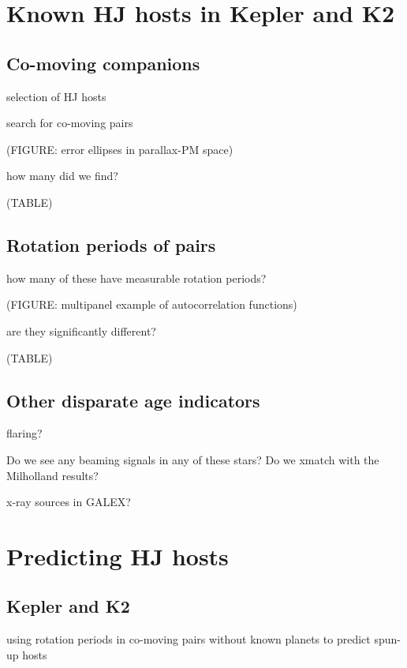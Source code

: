 \documentclass[twocolumn]{aastex62}
\begin{document}



\section{Known HJ hosts in Kepler and K2}
\subsection{Co-moving companions}

selection of HJ hosts

search for co-moving pairs

(FIGURE: error ellipses in parallax-PM space)

how many did we find?

(TABLE)

\subsection{Rotation periods of pairs}

how many of these have measurable rotation periods?

(FIGURE: multipanel example of autocorrelation functions)

are they significantly different?

(TABLE)

\subsection{Other disparate age indicators}

flaring?

Do we see any beaming signals in any of these stars? Do we xmatch with the Milholland results?

x-ray sources in GALEX?



\section{Predicting HJ hosts}
\subsection{Kepler and K2}
using rotation periods in co-moving pairs without known planets to predict spun-up hosts
\end{document}
